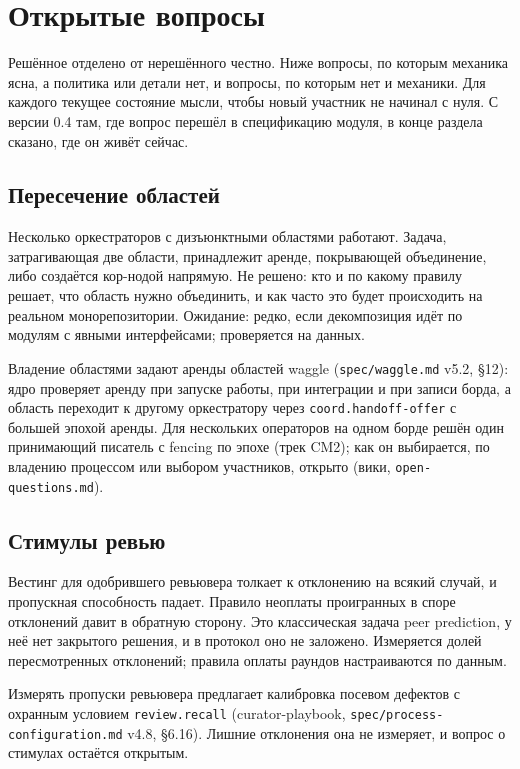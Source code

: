 \chapter{Открытые вопросы}

Решённое отделено от нерешённого честно. Ниже вопросы, по которым механика ясна, а политика или детали нет, и вопросы, по которым нет и механики. Для каждого текущее состояние мысли, чтобы новый участник не начинал с нуля. С версии 0.4 там, где вопрос перешёл в спецификацию модуля, в конце раздела сказано, где он живёт сейчас.

\section{Пересечение областей}

Несколько оркестраторов с дизъюнктными областями работают. Задача, затрагивающая две области, принадлежит аренде, покрывающей объединение, либо создаётся кор-нодой напрямую. Не решено: кто и по какому правилу решает, что область нужно объединить, и как часто это будет происходить на реальном монорепозитории. Ожидание: редко, если декомпозиция идёт по модулям с явными интерфейсами; проверяется на данных.

 Владение областями задают аренды областей waggle (\texttt{spec/waggle.md} v5.2, §12): ядро проверяет аренду при запуске работы, при интеграции и при записи борда, а область переходит к другому оркестратору через \texttt{coord.handoff-offer} с большей эпохой аренды. Для нескольких операторов на одном борде решён один принимающий писатель с fencing по эпохе (трек CM2); как он выбирается, по владению процессом или выбором участников, открыто (вики, \texttt{open-questions.md}).

\section{Стимулы ревью}

Вестинг для одобрившего ревьювера толкает к отклонению на всякий случай, и пропускная способность падает. Правило неоплаты проигранных в споре отклонений давит в обратную сторону. Это классическая задача peer prediction, у неё нет закрытого решения, и в протокол оно не заложено. Измеряется долей пересмотренных отклонений; правила оплаты раундов настраиваются по данным.

 Измерять пропуски ревьювера предлагает калибровка посевом дефектов с охранным условием \texttt{review.recall} (curator-playbook, \texttt{spec/process-configuration.md} v4.8, §6.16). Лишние отклонения она не измеряет, и вопрос о стимулах остаётся открытым.


